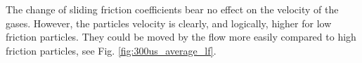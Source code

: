 
The change of sliding friction coefficients bear no effect on the
velocity of the gases. 
However, the particles velocity is clearly, and logically, higher for low
friction particles. 
They could be moved by the flow more easily compared to high
friction particles, see Fig. \ref{fig:300us_average_lf}.





